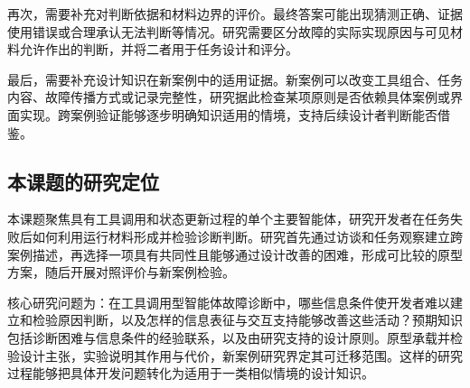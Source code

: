 再次，需要补充对判断依据和材料边界的评价。最终答案可能出现猜测正确、证据使用错误或合理承认无法判断等情况。研究需要区分故障的实际实现原因与可见材料允许作出的判断，并将二者用于任务设计和评分。

最后，需要补充设计知识在新案例中的适用证据。新案例可以改变工具组合、任务内容、故障传播方式或记录完整性，研究据此检查某项原则是否依赖具体案例或界面实现。跨案例验证能够逐步明确知识适用的情境，支持后续设计者判断能否借鉴。

\subsection{本课题的研究定位}

本课题聚焦具有工具调用和状态更新过程的单个主要智能体，研究开发者在任务失败后如何利用运行材料形成并检验诊断判断。研究首先通过访谈和任务观察建立跨案例描述，再选择一项具有共同性且能够通过设计改善的困难，形成可比较的原型方案，随后开展对照评价与新案例检验。

核心研究问题为：在工具调用型智能体故障诊断中，哪些信息条件使开发者难以建立和检验原因判断，以及怎样的信息表征与交互支持能够改善这些活动？预期知识包括诊断困难与信息条件的经验联系，以及由研究支持的设计原则。原型承载并检验设计主张，实验说明其作用与代价，新案例研究界定其可迁移范围。这样的研究过程能够把具体开发问题转化为适用于一类相似情境的设计知识。
